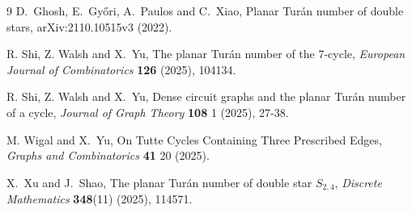\documentclass[11pt,a4paper]{article}
\theoremstyle{remark}
\begin{document}
\begin{thebibliography}{9}
D.~Ghosh, E.~Gy\H{o}ri, A.~Paulos and C.~Xiao, Planar Tur\'an number of double stars, {arXiv:2110.10515v3} (2022).

R. Shi, Z. Walsh and X.~Yu, The planar Tur\'an number of the 7-cycle, \emph{European Journal of Combinatorics} \textbf{126} (2025), 104134. 

R. Shi, Z. Walsh and X.~Yu, Dense circuit graphs and the planar Tur\'an number of a cycle, \emph{Journal of Graph Theory} \textbf{108} 1 (2025), 27-38. 


M. Wigal and X.~Yu, On Tutte Cycles Containing Three Prescribed Edges, \emph{Graphs and Combinatorics} \textbf{41} 20 (2025). 


X.~Xu and J.~Shao, The planar Tur\'an number of double star $S_{2,4}$, \emph{Discrete Mathematics} \textbf{348}(11) (2025), 114571. %


\end{thebibliography}
\end{document}
